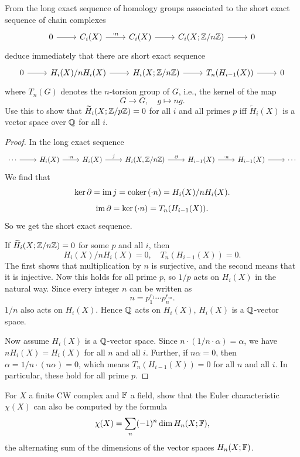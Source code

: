 \begin{exercise}
From the long exact sequence of homology groups associated to the short exact
sequence of chain complexes
\[\begin{tikzcd}
0\ar[r]&C_i(X)\ar[r,"\cdot n"]&C_i(X)\ar[r]&C_i(X;\Z/n\Z)\ar[r]&0
\end{tikzcd}\]
deduce immediately that there are short exact sequence
\[\begin{tikzcd}
0\ar[r]&H_i(X)/nH_i(X)\ar[r]&H_i(X;\Z/n\Z)\ar[r]&T_n(H_{i-1}(X))\ar[r]&0
\end{tikzcd}\]
where $T_n(G)$ denotes the $n$-torsion group of $G$, i.e., the kernel of the map
\[G\to G,\quad g\mapsto ng.\]
Use this to show that $\widetilde{H}_i(X;\mathbb{Z}/p\mathbb{Z})=0$ for all $i$ and all primes $p$ iff $\widetilde{H}_i(X)$ is a vector space over $\mathbb{Q}$ for all $i$.
\end{exercise}
\begin{proof}
In the long exact sequence 
\[\begin{tikzcd}
\cdots\ar[r]&H_i(X)\ar[r,"\cdot n"]&H_i(X)\ar[r,"j"]&H_i(X,\Z/n\Z)\ar[r,"\partial"]&H_{i-1}(X)\ar[r,"\cdot n"]&H_{i-1}(X)\ar[r]&\cdots
\end{tikzcd}\]
We find that
\[\mathrm{ker}\,\partial=\mathrm{im}\, j=\mathrm{coker}\,(\cdot n)=H_i(X)/nH_i(X).\]
\[\mathrm{im}\,\partial=\mathrm{ker}\,(\cdot n)=T_n(H_{i-1}(X)).\]
So we get the short exact sequence.\par
If $\widetilde{H}_i(X;\mathbb{Z}/n\mathbb{Z})=0$ for some $p$ and all $i$, then
\[H_i(X)/nH_i(X)=0,\quad T_n(H_{i-1}(X))=0.\]
The first shows that multiplication by $n$ is surjective, and the second means that it is injective. Now this holds for all prime $p$, so $1/p$ acts on $H_i(X)$ in the natural way. Since every integer $n$ can be written as
\[n=p_1^{r_1}\cdots p_n^{r_m}.\]
$1/n$ also acts on $H_i(X)$. Hence $\mathbb{Q}$ acts on $H_i(X)$, $H_i(X)$ is a $\mathbb{Q}$-vector space.\par
Now assume $H_i(X)$ is a $\mathbb{Q}$-vector space. Since $n\cdot(1/n\cdot\alpha)=\alpha$, we have $nH_i(X)=H_i(X)$ for all $n$ and all $i$. Further, if $n\alpha=0$, then $\alpha=1/n\cdot(n\alpha)=0$, which means $T_n(H_{i-1}(X))=0$ for all $n$ and all $i$. In particular, these hold for all prime $p$.
\end{proof}
\begin{exercise}
For $X$ a finite CW complex and $\mathbb{F}$ a field, show that the Euler characteristic $\chi(X)$ can also be computed by the formula \[\chi(X)=\sum_n(-1)^n\dim H_n(X;\mathbb{F}),\]
the alternating sum of the dimensions of the vector spaces $H_n(X;\mathbb{F})$.
\end{exercise}
